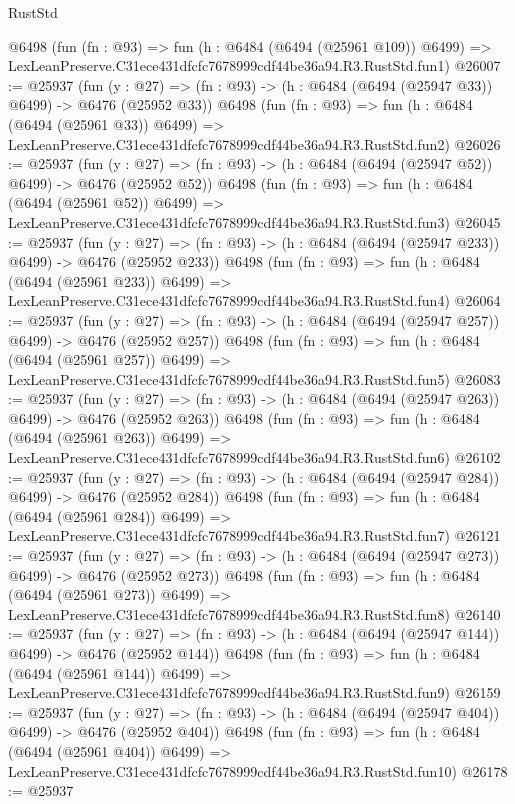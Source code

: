 \begin{lexlean}{RustStd}
\begin{coremodule}
    @6498
    (fun (fn : @93) =>
    fun (h : @6484 (@6494 (@25961 @109)) @6499) =>
    LexLeanPreserve.C31ece431dfcfc7678999cdf44be36a94.R3.RustStd.fun1)
@26007 := @25937
    (fun (y : @27) => (fn : @93) -> (h : @6484 (@6494 (@25947 @33)) @6499) -> @6476 (@25952 @33))
    @6498
    (fun (fn : @93) =>
    fun (h : @6484 (@6494 (@25961 @33)) @6499) =>
    LexLeanPreserve.C31ece431dfcfc7678999cdf44be36a94.R3.RustStd.fun2)
@26026 := @25937
    (fun (y : @27) => (fn : @93) -> (h : @6484 (@6494 (@25947 @52)) @6499) -> @6476 (@25952 @52))
    @6498
    (fun (fn : @93) =>
    fun (h : @6484 (@6494 (@25961 @52)) @6499) =>
    LexLeanPreserve.C31ece431dfcfc7678999cdf44be36a94.R3.RustStd.fun3)
@26045 := @25937
    (fun (y : @27) => (fn : @93) -> (h : @6484 (@6494 (@25947 @233)) @6499) -> @6476 (@25952 @233))
    @6498
    (fun (fn : @93) =>
    fun (h : @6484 (@6494 (@25961 @233)) @6499) =>
    LexLeanPreserve.C31ece431dfcfc7678999cdf44be36a94.R3.RustStd.fun4)
@26064 := @25937
    (fun (y : @27) => (fn : @93) -> (h : @6484 (@6494 (@25947 @257)) @6499) -> @6476 (@25952 @257))
    @6498
    (fun (fn : @93) =>
    fun (h : @6484 (@6494 (@25961 @257)) @6499) =>
    LexLeanPreserve.C31ece431dfcfc7678999cdf44be36a94.R3.RustStd.fun5)
@26083 := @25937
    (fun (y : @27) => (fn : @93) -> (h : @6484 (@6494 (@25947 @263)) @6499) -> @6476 (@25952 @263))
    @6498
    (fun (fn : @93) =>
    fun (h : @6484 (@6494 (@25961 @263)) @6499) =>
    LexLeanPreserve.C31ece431dfcfc7678999cdf44be36a94.R3.RustStd.fun6)
@26102 := @25937
    (fun (y : @27) => (fn : @93) -> (h : @6484 (@6494 (@25947 @284)) @6499) -> @6476 (@25952 @284))
    @6498
    (fun (fn : @93) =>
    fun (h : @6484 (@6494 (@25961 @284)) @6499) =>
    LexLeanPreserve.C31ece431dfcfc7678999cdf44be36a94.R3.RustStd.fun7)
@26121 := @25937
    (fun (y : @27) => (fn : @93) -> (h : @6484 (@6494 (@25947 @273)) @6499) -> @6476 (@25952 @273))
    @6498
    (fun (fn : @93) =>
    fun (h : @6484 (@6494 (@25961 @273)) @6499) =>
    LexLeanPreserve.C31ece431dfcfc7678999cdf44be36a94.R3.RustStd.fun8)
@26140 := @25937
    (fun (y : @27) => (fn : @93) -> (h : @6484 (@6494 (@25947 @144)) @6499) -> @6476 (@25952 @144))
    @6498
    (fun (fn : @93) =>
    fun (h : @6484 (@6494 (@25961 @144)) @6499) =>
    LexLeanPreserve.C31ece431dfcfc7678999cdf44be36a94.R3.RustStd.fun9)
@26159 := @25937
    (fun (y : @27) => (fn : @93) -> (h : @6484 (@6494 (@25947 @404)) @6499) -> @6476 (@25952 @404))
    @6498
    (fun (fn : @93) =>
    fun (h : @6484 (@6494 (@25961 @404)) @6499) =>
    LexLeanPreserve.C31ece431dfcfc7678999cdf44be36a94.R3.RustStd.fun10)
@26178 := @25937

\end{coremodule}
\end{lexlean}
